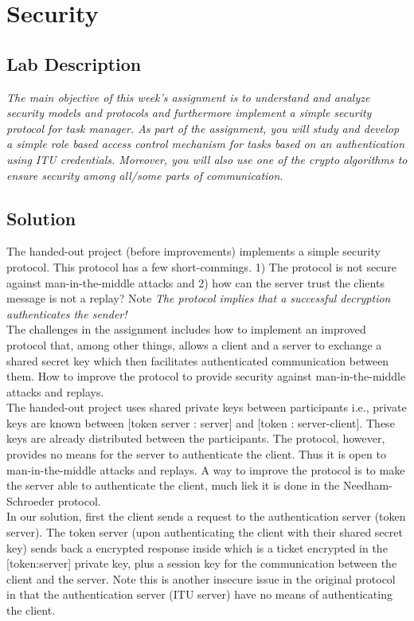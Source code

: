 \chapter{Security}
\minitoc

\section{Lab Description}
\textit{The main objective of this week's assignment is to understand and analyze security models and protocols and furthermore implement a simple security protocol for task manager. As part of the assignment, you will study and develop a simple role based access control mechanism for tasks based on an authentication using ITU credentials. Moreover, you will also use one of the crypto algorithms to ensure security among all/some parts of communication.}

\section{Solution}

The handed-out project (before improvements) implements a simple security protocol. This protocol has a few short-commings. 1) The protocol is not secure against man-in-the-middle attacks and 2) how can the server trust the clients message is not a replay? Note \textit{The protocol implies that a successful decryption authenticates the sender!} \\

The challenges in the assignment includes how to implement an improved protocol that, among other things, allows a client and a server to exchange a shared secret key which then facilitates authenticated communication between them. How to improve the protocol to provide security against man-in-the-middle attacks and replays.  \\

The handed-out project uses shared private keys between participants i.e., private keys are known between [token server : server] and [token : server-client]. These keys are already distributed between the participants. The protocol, however, provides no means for the server to authenticate the client. Thus it is open to man-in-the-middle attacks and replays. A way to improve the protocol is to make the server able to authenticate the client, much liek it is done in the Needham-Schroeder protocol.\\


In our solution, first the client sends a request to the authentication server (token server). The token server (upon authenticating the client with their shared secret key) sends back a encrypted response inside which is a ticket encrypted in the [token:server] private key, plus a session key for the communication between the client and the server. Note this is another insecure issue in the original protocol in that the authentication server (ITU server) have no means of authenticating the client. \\



